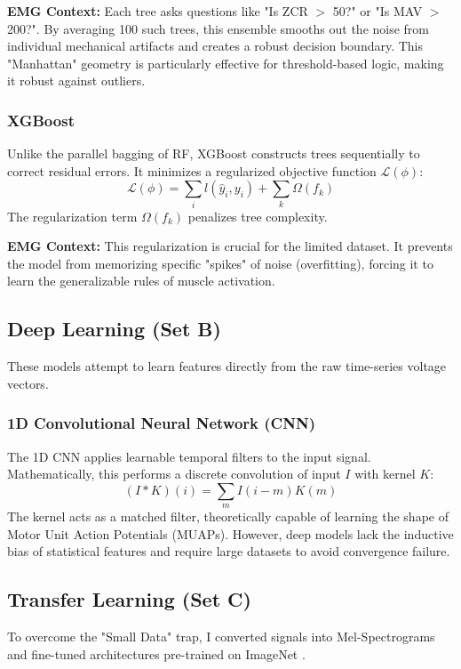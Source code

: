 \documentclass{article}
\begin{document}
\textbf{EMG Context:} Each tree asks questions like "Is ZCR $>$ 50?" or "Is MAV $>$ 200?". By averaging 100 such trees, this ensemble smooths out the noise from individual mechanical artifacts and creates a robust decision boundary. This "Manhattan" geometry is particularly effective for threshold-based logic, making it robust against outliers.

\subsubsection{XGBoost}
Unlike the parallel bagging of RF, XGBoost constructs trees sequentially to correct residual errors. It minimizes a regularized objective function $\mathcal{L}(\phi)$:
\begin{equation}
    \mathcal{L}(\phi) = \sum_{i} l(\hat{y}_i, y_i) + \sum_{k} \Omega(f_k)
\end{equation}
The regularization term $\Omega(f_k)$ penalizes tree complexity.

\textbf{EMG Context:} This regularization is crucial for the limited dataset. It prevents the model from memorizing specific "spikes" of noise (overfitting), forcing it to learn the generalizable rules of muscle activation.

\subsection{Deep Learning (Set B)}
These models attempt to learn features directly from the raw time-series voltage vectors.

\subsubsection{1D Convolutional Neural Network (CNN)}
The 1D CNN applies learnable temporal filters to the input signal. Mathematically, this performs a discrete convolution of input $I$ with kernel $K$:
\begin{equation}
    (I * K)(i) = \sum_{m} I(i-m)K(m)
\end{equation}
The kernel acts as a matched filter, theoretically capable of learning the shape of Motor Unit Action Potentials (MUAPs). However, deep models lack the inductive bias of statistical features and require large datasets to avoid convergence failure.

\subsection{Transfer Learning (Set C)}
To overcome the "Small Data" trap, I converted signals into Mel-Spectrograms and fine-tuned architectures pre-trained on ImageNet \cite{imagenet}.
\end{document}
